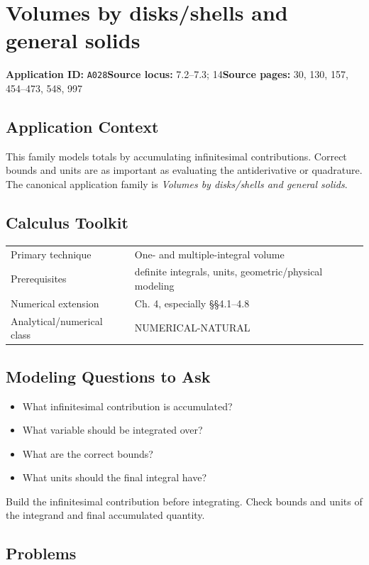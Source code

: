 \documentclass[11pt]{book}
\newcommand{\pid}[1]{\texttt{#1}}
\begin{document}
\chapter{Volumes by disks/shells and general solids}\label{app:A028}
\textbf{Application ID:} \pid{A028}\quad \textbf{Source locus:} 7.2–7.3; 14\quad \textbf{Source pages:} 30, 130, 157, 454–473, 548, 997
\section*{Application Context}
This family models totals by accumulating infinitesimal contributions. Correct bounds and units are as important as evaluating the antiderivative or quadrature. The canonical application family is \emph{Volumes by disks/shells and general solids}.
\section*{Calculus Toolkit}
\begin{tabularx}{\textwidth}{@{}lX@{}}\toprule
Primary technique & One- and multiple-integral volume \\
Prerequisites & definite integrals, units, geometric/physical modeling \\
Numerical extension & Ch. 4, especially §§4.1–4.8 \\
Analytical/numerical class & NUMERICAL-NATURAL \\
\bottomrule\end{tabularx}
\section*{Modeling Questions to Ask}\begin{itemize}
\item What infinitesimal contribution is accumulated?
\item What variable should be integrated over?
\item What are the correct bounds?
\item What units should the final integral have?
\end{itemize}
\begin{errorbox}Build the infinitesimal contribution before integrating. Check bounds and units of the integrand and final accumulated quantity.\end{errorbox}
\section*{Problems}
\end{document}
